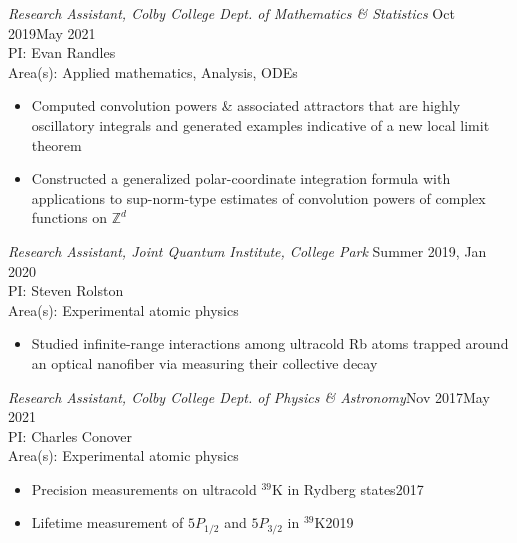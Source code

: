 \documentclass[10pt]{article}
\begin{document}
\noindent \textit{Research Assistant, Colby College Dept. of Mathematics \& Statistics} \hfill Oct 2019\textendash May 2021\\
PI: Evan Randles  \\ 
Area(s): Applied mathematics, Analysis, ODEs  \vspace{-5pt}
\begin{itemize}
	\setlength\itemsep{-4pt}
	\item Computed convolution powers \& associated attractors that are highly oscillatory integrals and generated examples indicative of a new local limit theorem
	\item Constructed a generalized polar-coordinate integration formula with applications to sup-norm-type estimates of convolution powers of complex functions on $\mathbb{Z}^d$
\end{itemize}


\noindent \textit{Research Assistant, Joint Quantum Institute, College Park} \hfill Summer 2019, Jan 2020  \\
PI:  Steven Rolston\\  %
Area(s): Experimental atomic physics  \vspace{-5pt}
\begin{itemize}
	\setlength\itemsep{-4pt}
	\item Studied infinite-range interactions among ultracold Rb atoms trapped around an optical nanofiber via measuring their collective decay
\end{itemize}





\noindent \textit{Research Assistant, Colby College Dept. of Physics \& Astronomy}\hfill Nov 2017\textendash May 2021 \\
PI: Charles Conover \\ %
Area(s): Experimental atomic physics \vspace{-5pt}
\begin{itemize}
	\setlength\itemsep{-4pt}
	\item Precision measurements on ultracold $^{\text{39}}$K in Rydberg states\hfill 2017 
	\item Lifetime measurement of $5P_{1/2}$ and $5P_{3/2}$ in $^{\text{39}}$K\hfill 2019
\end{itemize}
\end{document}
